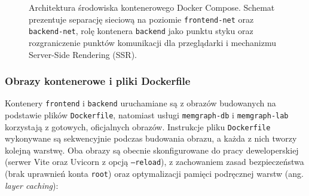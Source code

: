 \documentclass[twoside]{projektInzynierskiMS1z}
\begin{document}
\begin{figure}[p]
{%
}
\caption{Architektura środowiska kontenerowego Docker Compose. Schemat prezentuje separację sieciową na poziomie \texttt{frontend-net} oraz \texttt{backend-net}, rolę kontenera \texttt{backend} jako punktu styku oraz rozgraniczenie punktów komunikacji dla przeglądarki i mechanizmu Server-Side Rendering (SSR).}
\label{fig:docker_architektura_full}
\end{figure}

\newpage

\subsubsection{Obrazy kontenerowe i pliki Dockerfile}

Kontenery \texttt{frontend} i \texttt{backend} uruchamiane są z obrazów
budowanych na podstawie plików \texttt{Dockerfile}, natomiast usługi
\texttt{memgraph-db} i \texttt{memgraph-lab} korzystają z gotowych, oficjalnych
obrazów. Instrukcje pliku \texttt{Dockerfile} wykonywane są sekwencyjnie podczas
budowania obrazu, a każda z nich tworzy kolejną warstwę. Oba obrazy są obecnie
skonfigurowane do pracy deweloperskiej (serwer Vite oraz Uvicorn z opcją
\texttt{--reload}), z zachowaniem zasad bezpieczeństwa (brak uprawnień konta
\texttt{root}) oraz optymalizacji pamięci podręcznej warstw
(ang. \emph{layer caching}):
\end{document}
